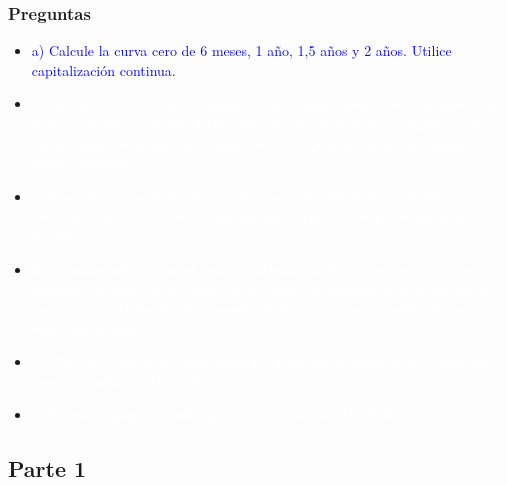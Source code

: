\documentclass{beamer}
\begin{document}
  \begin{frame}
    \frametitle{Preguntas}
    \begin{itemize}
      \scriptsize
      \item {\Large\textcolor{blue}{a) Calcule la curva cero de 6 meses, 1 año, 1,5 años y 2 años. Utilice capitalización continua.}}
      \vspace{3pt}
      \item {\textcolor{white}{b) Grafique la curva cero y comente (sin realizar cálculos) si la pendiente de la curva de los bonos del BCCh (con cupones) es positiva o negativa. ¿Qué factor explica el \textit{spread} entre ambas curvas?, ¿Por qué el \textit{spread} aumenta a mayor madurez?}}
      \vspace{3pt}
      \item {\textcolor{white}{c) Comente cuál es la interpretación económica detrás de la pendiente observada en la curva cero. ¿Qué nos dice respecto a la probabilidad de recesión?}}
      \vspace{3pt}
      \item {\textcolor{white}{d) Considerando que usted tiene la información de la curva cero, la curva \textit{forward} y la curva de las \textit{yields} de los bonos de gobierno. Señale qué curva usaría para calcular el valor presente de las ganancias o pérdidas de los contratos \textit{forward}.}}
      \vspace{3pt}
      \item {\textcolor{white}{e) ¿Cuál es el rol de las probabilidades neutrales al riesgo en d)?, ¿Qué rol juega la condición de no arbitraje?}}
      \vspace{3pt}
      \item {\textcolor{white}{f) Calcule el punto a) utilizando matrices en Excel/R/Python.}}
      \vspace{3pt}
    \end{itemize}
  \end{frame}

\subsection{Parte 1}

\newcommand{\capcontinuacero}{ F = P \cdot e^{-rT}}
\newcommand{\capcontinua}{F = \sum_{i=1}^{n} \frac{C_i}{e^{r_i t_i}} + \frac{P}{e^{r_n t_n}}}

\end{document}
